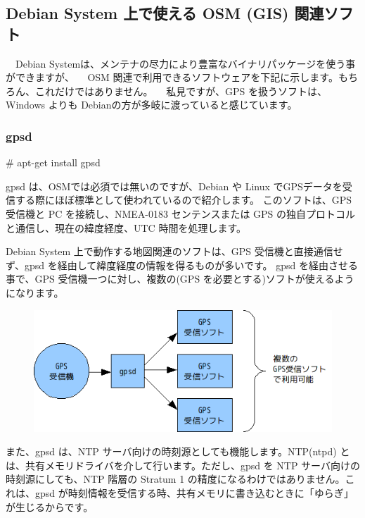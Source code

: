 \documentclass[mingoth,a4paper]{jsarticle}
\begin{document}
\subsection{Debian System 上で使える OSM (GIS) 関連ソフト}
　Debian Systemは、メンテナの尽力により豊富なバイナリパッケージを使う事ができますが、
　OSM 関連で利用できるソフトウェアを下記に示します。もちろん、これだけではありません。
　私見ですが、GPS を扱うソフトは、Windows よりも Debianの方が多岐に渡っていると感じています。

\subsubsection{gpsd}

\begin{commandline}
# apt-get install gpsd
\end{commandline}

gpsd は、OSMでは必須では無いのですが、Debian や Linux でGPSデータを受信する際にほぼ標準として使われているので紹介します。
このソフトは、GPS 受信機と PC を接続し、NMEA-0183 センテンスまたは GPS の独自プロトコルと通信し、現在の緯度経度、UTC 時間を処理します。

Debian System 上で動作する地図関連のソフトは、GPS 受信機と直接通信せず、gpsd を経由して緯度経度の情報を得るものが多いです。
gpsd を経由させる事で、GPS 受信機一つに対し、複数の(GPS を必要とする)ソフトが使えるようになります。

\begin{figure}[h]
 \centering
 \includegraphics[scale=0.9]{image200912/debianosm6.png}
\end{figure}

また、gpsd は、NTP サーバ向けの時刻源としても機能します。NTP(ntpd) とは、共有メモリドライバを介して行います。ただし、gpsd を NTP サーバ向けの時刻源にしても、NTP 階層の Stratum 1 の精度になるわけではありません。これは、gpsd が時刻情報を受信する時、共有メモリに書き込むときに「ゆらぎ」が生じるからです。
\end{document}
